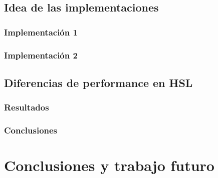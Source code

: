 \documentclass[a4paper]{article}
\begin{document}
\subsection{Idea de las implementaciones}

\subsubsection{Implementación 1}

\subsubsection{Implementación 2}

\subsection{Diferencias de performance en HSL}

\subsubsection{Resultados}

\subsubsection{Conclusiones}


\newpage
\section{Conclusiones y trabajo futuro}
\end{document}
